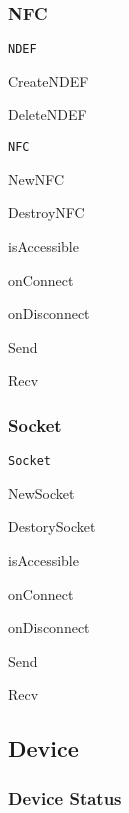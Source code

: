 \subsubsection*{N\-F\-C}


\begin{DoxyItemize}
\item {\tt N\-D\-E\-F}
\begin{DoxyItemize}
\item Create\-N\-D\-E\-F
\item Delete\-N\-D\-E\-F
\end{DoxyItemize}
\item {\tt N\-F\-C}
\begin{DoxyItemize}
\item New\-N\-F\-C
\item Destroy\-N\-F\-C
\item is\-Accessible
\item on\-Connect
\item on\-Disconnect
\item Send
\item Recv
\end{DoxyItemize}
\end{DoxyItemize}

\subsubsection*{Socket}


\begin{DoxyItemize}
\item {\tt Socket}
\begin{DoxyItemize}
\item New\-Socket
\item Destory\-Socket
\item is\-Accessible
\item on\-Connect
\item on\-Disconnect
\item Send
\item Recv
\end{DoxyItemize}
\end{DoxyItemize}

\subsection*{Device}

\subsubsection*{Device Status}


